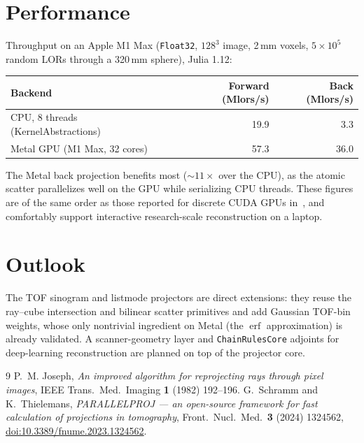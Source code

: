 \documentclass[11pt,a4paper]{article}
\begin{document}
\section{Performance}

Throughput on an Apple M1 Max (\texttt{Float32}, $128^3$ image, 2\,mm voxels,
$5\times 10^5$ random LORs through a 320\,mm sphere), Julia 1.12:

\begin{center}
\begin{tabular}{lrr}
\toprule
Backend & Forward (Mlors/s) & Back (Mlors/s) \\
\midrule
CPU, 8 threads (KernelAbstractions) & 19.9 & 3.3 \\
Metal GPU (M1 Max, 32 cores)        & 57.3 & 36.0 \\
\bottomrule
\end{tabular}
\end{center}

The Metal back projection benefits most ($\sim 11\times$ over the CPU), as the
atomic scatter parallelizes well on the GPU while serializing CPU threads.
These figures are of the same order as those reported for discrete CUDA GPUs
in~\cite{schramm2023}, and comfortably support interactive research-scale
reconstruction on a laptop.

\section{Outlook}

The TOF sinogram and listmode projectors are direct extensions: they reuse
the ray--cube intersection and bilinear scatter primitives and add Gaussian
TOF-bin weights, whose only nontrivial ingredient on Metal (the
$\operatorname{erf}$ approximation) is already validated. A scanner-geometry
layer and \texttt{ChainRulesCore} adjoints for deep-learning reconstruction
are planned on top of the projector core.

\begin{thebibliography}{9}
 P.~M. Joseph,
  \emph{An improved algorithm for reprojecting rays through pixel images},
  IEEE Trans.\ Med.\ Imaging \textbf{1} (1982) 192--196.
 G.~Schramm and K.~Thielemans,
  \emph{PARALLELPROJ --- an open-source framework for fast calculation of
  projections in tomography},
  Front.\ Nucl.\ Med.\ \textbf{3} (2024) 1324562,
  \href{https://doi.org/10.3389/fnume.2023.1324562}{doi:10.3389/fnume.2023.1324562}.
\end{thebibliography}
\end{document}
